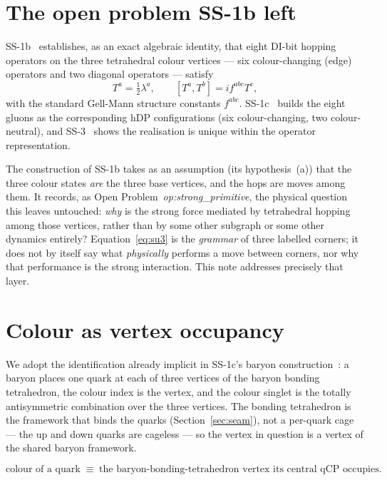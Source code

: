 \documentclass[11pt,a4paper]{article}
\newcommand{\hDP}{\mathrm{hDP}}
\newcommand{\qCP}{\mathrm{qCP}}
\begin{document}
\section{The open problem SS-1b left}
\label{sec:openprob}

SS-1b~\citep{ss1b} establishes, as an exact algebraic identity, that eight
DI-bit hopping operators on the three tetrahedral colour vertices --- six
colour-changing (edge) operators and two diagonal operators --- satisfy
\begin{equation}
T^a = \tfrac{1}{2}\lambda^a,\qquad [T^a,T^b] = i f^{abc} T^c,
\label{eq:su3}
\end{equation}
with the standard Gell-Mann structure constants $f^{abc}$. SS-1c~\citep{ss1c}
builds the eight gluons as the corresponding $\hDP$ configurations (six
colour-changing, two colour-neutral), and SS-3~\citep{ss3} shows the
realisation is unique within the operator representation.

The construction of SS-1b takes as an assumption (its hypothesis~(a)) that the
three colour states \emph{are} the three base vertices, and the hops are moves
among them. It records, as Open Problem~\emph{op:strong\_primitive}, the
physical question this leaves untouched: \emph{why} is the strong force
mediated by tetrahedral hopping among those vertices, rather than by some other
subgraph or some other dynamics entirely? Equation~\eqref{eq:su3} is the
\emph{grammar} of three labelled corners; it does not by itself say what
\emph{physically} performs a move between corners, nor why that performance is
the strong interaction. This note addresses precisely that layer.

\section{Colour as vertex occupancy}
\label{sec:occupancy}

We adopt the identification already implicit in SS-1c's baryon
construction~\citep{ss1c}: a baryon places one quark at each of three vertices
of the baryon bonding tetrahedron, the colour index is the vertex, and the
colour singlet is the totally antisymmetric combination over the three vertices.
The bonding tetrahedron is the framework that binds the quarks (Section~\ref{sec:seam}),
not a per-quark cage --- the up and down quarks are cageless --- so the vertex
in question is a vertex of the shared baryon framework.

\begin{equation}
\text{colour of a quark} \;\equiv\; \text{the baryon-bonding-tetrahedron vertex its central }\qCP
\text{ occupies.}
\end{equation}
\end{document}

